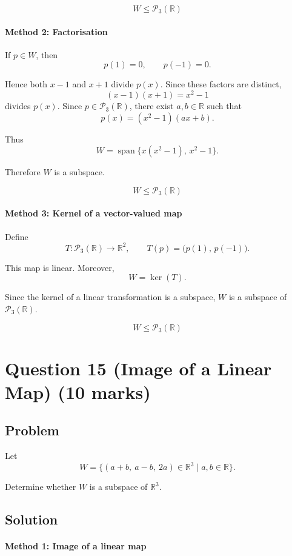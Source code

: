 \documentclass[12pt]{article}
\newcommand{\Span}{\operatorname{span}}
\begin{document}
\[
\boxed{W\le \mathcal P_3(\mathbb R)}
\]

\paragraph{Method 2: Factorisation}

If \(p\in W\), then
\[
p(1)=0,\qquad p(-1)=0.
\]

Hence both \(x-1\) and \(x+1\) divide \(p(x)\). Since these factors are distinct,
\[
(x-1)(x+1)=x^2-1
\]
divides \(p(x)\). Since \(p\in\mathcal P_3(\mathbb R)\), there exist \(a,b\in\mathbb R\) such that
\[
p(x)=(x^2-1)(ax+b).
\]

Thus
\[
W=\Span\{x(x^2-1),\,x^2-1\}.
\]

Therefore \(W\) is a subspace.

\[
\boxed{W\le \mathcal P_3(\mathbb R)}
\]

\paragraph{Method 3: Kernel of a vector-valued map}

Define
\[
T:\mathcal P_3(\mathbb R)\to\mathbb R^2,\qquad
T(p)=\bigl(p(1),\,p(-1)\bigr).
\]

This map is linear. Moreover,
\[
W=\ker(T).
\]

Since the kernel of a linear transformation is a subspace, \(W\) is a subspace of \(\mathcal P_3(\mathbb R)\).

\[
\boxed{W\le \mathcal P_3(\mathbb R)}
\]

\newpage
\section{Question 15 (Image of a Linear Map) \hfill (10 marks)}
\subsection{Problem}

Let
\[
W=\{(a+b,\ a-b,\ 2a)\in\mathbb R^3\mid a,b\in\mathbb R\}.
\]

Determine whether \(W\) is a subspace of \(\mathbb R^3\).

\subsection{Solution}

\paragraph{Method 1: Image of a linear map}
\end{document}
